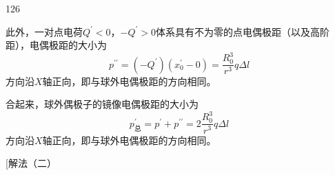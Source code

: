 \begin{solution}{126}
\begin{subsolution}
        此外，一对点电荷$Q ^ { \prime } < 0$，$- Q ^ { \prime } > 0$体系具有不为零的点电偶极距（以及高阶距），电偶极距的大小为
        \begin{equation}
            p ^ {\prime \prime} = (- Q ^ {\prime}) (x _ {0} ^ {\prime} - 0) = \frac {R _ {0} ^ {3}}{r ^ {3}} q \Delta l
            \label{eq:13.s126}
        \end{equation}
        方向沿$X$轴正向，即与球外电偶极距的方向相同。

        合起来，球外偶极子的镜像电偶极距的大小为
        \begin{equation}
            p _ {\text {总}} ^ {\prime} = p ^ {\prime} + p ^ {\prime \prime} = 2 \frac {R _ {0} ^ {3}}{r ^ {3}} q \Delta l
            \label{eq:14.s126}
        \end{equation}
        方向沿$X$轴正向，即与球外电偶极距的方向相同。

        [解法（二）


\end{subsolution}
\end{solution}
